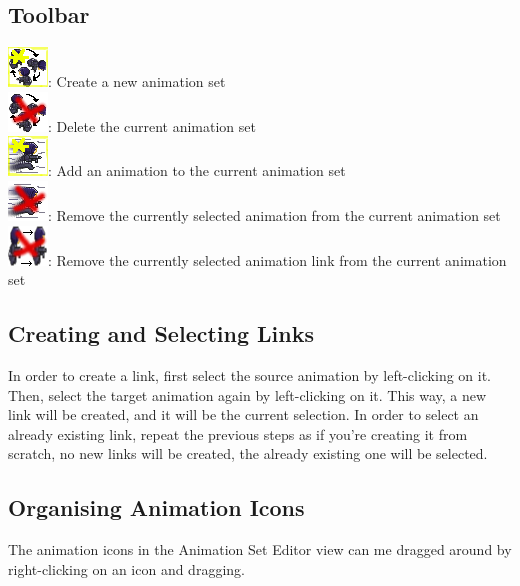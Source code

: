 \documentclass{article}
\begin{document}
\subsection{Toolbar}
\begin{description}
\item[\includegraphics{icons/NewAnimationSet}: Create a new animation set]
\item[\includegraphics{icons/deleteAnimationSet}: Delete the current animation set]
\item[\includegraphics{icons/NewAnimation}: Add an animation to the current animation set]
\item[\includegraphics{icons/deleteAnimation}: Remove the currently selected animation from the current animation set]
\item[\includegraphics{icons/deleteLink}: Remove the currently selected animation link from the current animation set]
\end{description}

\subsection{Creating and Selecting Links}
In order to create a link, first select the source animation by left-clicking on it. Then, select the target animation again by left-clicking on it. This way, a new
link will be created, and it will be the current selection. In order to select an already existing link, repeat the previous steps as if you're creating it from scratch,
no new links will be created, the already existing one will be selected.

\subsection{Organising Animation Icons}
The animation icons in the Animation Set Editor view can me dragged around by right-clicking on an icon and dragging.
\end{document}
